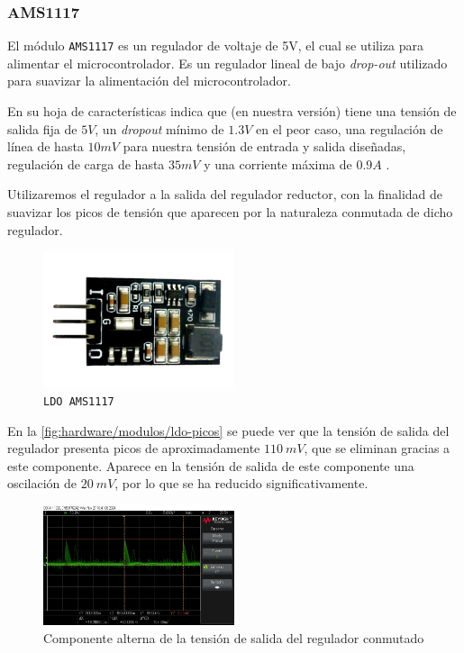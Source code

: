 \subsubsection{AMS1117}

El módulo \texttt{AMS1117} es un regulador de voltaje de 5V, el cual se utiliza para alimentar el microcontrolador. Es un regulador lineal de bajo \textit{drop-out} utilizado para suavizar la alimentación del microcontrolador. 

En su hoja de características indica que (en nuestra versión) tiene una tensión de salida fija de $5 V$, un \textit{dropout} mínimo de $1.3 V$ en el peor caso, una regulación de línea de hasta $10 mV$ para nuestra tensión de entrada y salida diseñadas, regulación de carga de hasta $35 mV$ y una corriente máxima de $0.9 A$ \cite{advancedmonolithicsystemsAMS1117}.

Utilizaremos el regulador a la salida del regulador reductor, con la finalidad de suavizar los picos de tensión que aparecen por la naturaleza conmutada de dicho regulador.

\begin{figure}[H]
    \centering
    \includegraphics[width=0.5\textwidth]{images/2-hardware/componentes/AMS1117.png}
    \caption{\texttt{LDO AMS1117}}
    \label{fig:hardware/modulos/ldo-ams1117}
\end{figure}

En la \autoref{fig:hardware/modulos/ldo-picos} se puede ver que la tensión de salida del regulador presenta picos de aproximadamente $110\ mV$, que se eliminan gracias a este componente. Aparece en la tensión de salida de este componente una oscilación de $20\ mV$, por lo que se ha reducido significativamente.

\begin{figure}[h]
    \centering
    \includegraphics[width=0.5\textwidth]{images/2-hardware/componentes/ldo/picosSinLDO.jpg}
    \caption{Componente alterna de la tensión de salida del regulador conmutado}
    \label{fig:hardware/modulos/ldo-picos}
\end{figure}

